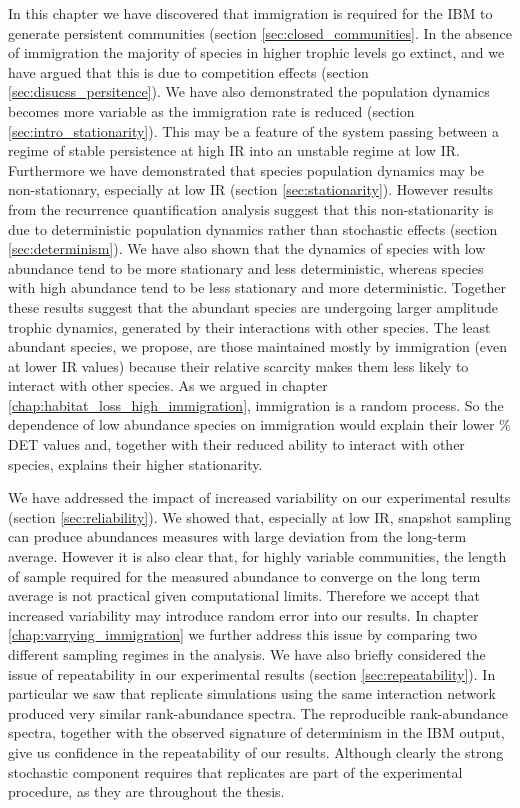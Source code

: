In this chapter we have discovered that immigration is required for the IBM to generate persistent communities (section \ref{sec:closed_communities}. In the absence of immigration the majority of species in higher trophic levels go extinct, and we have argued that this is due to competition effects (section \ref{sec:disucss_persitence}). We have also demonstrated the population dynamics becomes more variable as the immigration rate is reduced (section \ref{sec:intro_stationarity}). This may be a feature of the system passing between a regime of stable persistence at high IR into an unstable regime at low IR. Furthermore we have demonstrated that species population dynamics may be non-stationary, especially at low IR (section \ref{sec:stationarity}). However results from the recurrence quantification analysis suggest that this non-stationarity is due to deterministic population dynamics rather than stochastic effects (section \ref{sec:determinism}). We have also shown that the dynamics of species with low abundance tend to be more stationary and less deterministic, whereas species with high abundance tend to be less stationary and more deterministic. Together these results suggest that the abundant species are undergoing larger amplitude trophic dynamics, generated by their interactions with other species. The least abundant species, we propose, are those maintained mostly by immigration (even at lower IR values) because their relative scarcity makes them less likely to interact with other species. As we argued in chapter \ref{chap:habitat_loss_high_immigration}, immigration is a random process. So the dependence of low abundance species on immigration would explain their lower $\%$DET values and, together with their reduced ability to interact with other species, explains their higher stationarity.

We have addressed the impact of increased variability on our experimental results (section \ref{sec:reliability}). We showed that, especially at low IR, snapshot sampling can produce abundances measures with large deviation from the long-term average. However it is also clear that, for highly variable communities, the length of sample required for the measured abundance to converge on the long term average is not practical given computational limits. Therefore we accept that increased variability may introduce random error into our results. In chapter \ref{chap:varrying_immigration} we further address this issue by comparing two different sampling regimes in the analysis. We have also briefly considered the issue of repeatability in our experimental results (section \ref{sec:repeatability}). In particular we saw that replicate simulations using the same interaction network produced very similar rank-abundance spectra. The reproducible rank-abundance spectra, together with the observed signature of determinism in the IBM output, give us confidence in the repeatability of our results. Although clearly the strong stochastic component requires that replicates are part of the experimental procedure, as they are throughout the thesis.   

